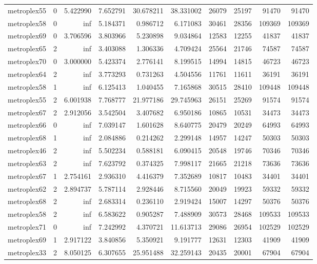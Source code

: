 \begin{longtable}{|l|r|r|r|r|r|r|r|r|r|}
metroplex55 & 0 & 5.422990 & 7.652791 & 30.678211 & 38.331002 & 26079 & 25197 & 91470 & 91470 \\
metroplex58 & 0 & inf & 5.184371 & 0.986712 & 6.171083 & 30461 & 28356 & 109369 & 109369 \\
metroplex69 & 0 & 3.706596 & 3.803966 & 5.230898 & 9.034864 & 12583 & 12255 & 41837 & 41837 \\
metroplex65 & 2 & inf & 3.403088 & 1.306336 & 4.709424 & 25564 & 21746 & 74587 & 74587 \\
metroplex70 & 0 & 3.000000 & 5.423374 & 2.776141 & 8.199515 & 14994 & 14815 & 46723 & 46723 \\
metroplex64 & 2 & inf & 3.773293 & 0.731263 & 4.504556 & 11761 & 11611 & 36191 & 36191 \\
metroplex58 & 1 & inf & 6.125413 & 1.040455 & 7.165868 & 30515 & 28410 & 109448 & 109448 \\
metroplex55 & 2 & 6.001938 & 7.768777 & 21.977186 & 29.745963 & 26151 & 25269 & 91574 & 91574 \\
metroplex67 & 2 & 2.912056 & 3.542504 & 3.407682 & 6.950186 & 10865 & 10531 & 34473 & 34473 \\
metroplex66 & 0 & inf & 7.039147 & 1.601628 & 8.640775 & 20479 & 20249 & 64993 & 64993 \\
metroplex68 & 1 & inf & 2.084886 & 0.214262 & 2.299148 & 14957 & 14247 & 50303 & 50303 \\
metroplex46 & 2 & inf & 5.502234 & 0.588181 & 6.090415 & 20548 & 19746 & 70346 & 70346 \\
metroplex63 & 2 & inf & 7.623792 & 0.374325 & 7.998117 & 21665 & 21218 & 73636 & 73636 \\
metroplex67 & 1 & 2.754161 & 2.936310 & 4.416379 & 7.352689 & 10817 & 10483 & 34401 & 34401 \\
metroplex62 & 2 & 2.894737 & 5.787114 & 2.928446 & 8.715560 & 20049 & 19923 & 59332 & 59332 \\
metroplex68 & 2 & inf & 2.683314 & 0.236110 & 2.919424 & 15007 & 14297 & 50376 & 50376 \\
metroplex58 & 2 & inf & 6.583622 & 0.905287 & 7.488909 & 30573 & 28468 & 109533 & 109533 \\
metroplex71 & 0 & inf & 7.242992 & 4.370721 & 11.613713 & 29086 & 26954 & 102529 & 102529 \\
metroplex69 & 1 & 2.917122 & 3.840856 & 5.350921 & 9.191777 & 12631 & 12303 & 41909 & 41909 \\
metroplex33 & 2 & 8.050125 & 6.307655 & 25.951488 & 32.259143 & 20435 & 20001 & 67904 & 67904 \\

\end{longtable}
